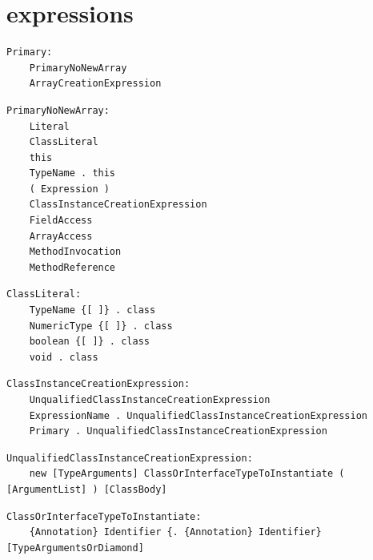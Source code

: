 \section{expressions}

\noindent\textbf{\texttt{}}\par
\begin{lstlisting}
Primary:
    PrimaryNoNewArray
    ArrayCreationExpression
\end{lstlisting}

\noindent\textbf{\texttt{}}\par
\begin{lstlisting}
PrimaryNoNewArray:
    Literal
    ClassLiteral
    this
    TypeName . this
    ( Expression )
    ClassInstanceCreationExpression
    FieldAccess
    ArrayAccess
    MethodInvocation
    MethodReference
\end{lstlisting}

\noindent\textbf{\texttt{}}\par
\begin{lstlisting}
ClassLiteral:
    TypeName {[ ]} . class
    NumericType {[ ]} . class
    boolean {[ ]} . class
    void . class
\end{lstlisting}

\noindent\textbf{\texttt{}}\par
\begin{lstlisting}
ClassInstanceCreationExpression:
    UnqualifiedClassInstanceCreationExpression
    ExpressionName . UnqualifiedClassInstanceCreationExpression
    Primary . UnqualifiedClassInstanceCreationExpression
\end{lstlisting}

\noindent\textbf{\texttt{}}\par
\begin{lstlisting}
UnqualifiedClassInstanceCreationExpression:
    new [TypeArguments] ClassOrInterfaceTypeToInstantiate ( [ArgumentList] ) [ClassBody]
\end{lstlisting}

\noindent\textbf{\texttt{}}\par
\begin{lstlisting}
ClassOrInterfaceTypeToInstantiate:
    {Annotation} Identifier {. {Annotation} Identifier} [TypeArgumentsOrDiamond]
\end{lstlisting}

